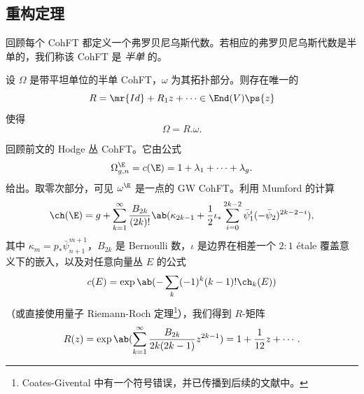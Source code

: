 \subsection{重构定理}%
\label{sub:Reconstruction theorem}

回顾每个 CohFT 都定义一个弗罗贝尼乌斯代数。若相应的弗罗贝尼乌斯代数是半单的，我们称该 CohFT 是 \textit{半单} 的。

\begin{thm}%
\label{thm:teleman}
    设 $\Omega$ 是带平坦单位的半单 CohFT，$\omega$ 为其拓扑部分。则存在唯一的
    \[ R = \mr{Id} + R_1 z + \cdots \in \End(V)\ps{z} \]
    使得
    \[ \Omega = R.\omega. \]
\end{thm}

\begin{exm}
    回顾前文的 Hodge 丛 CohFT。它由公式
    \[ \Omega^{\E}_{g,n} = c(\E) = 1 + \lambda_1 + \cdots + \lambda_g. \]
    给出。取零次部分，可见 $\omega^{\E}$ 是一点的 GW CohFT。利用 Mumford 的计算
    \[ \ch(\E) = g + \sum_{k=1}^{\infty} \frac{B_{2k}}{(2k)!}\ab(\kappa_{2k-1} + \frac{1}{2}\iota_*\sum_{i=0}^{2k-2} \bar{\psi}_1^{i} (-\bar{\psi}_2)^{2k-2-i}), \]
    其中 $\kappa_{m} = p_* \bar{\psi}_{n+1}^{m+1}$，$B_{2k}$ 是 Bernoulli 数，$\iota$ 是边界在相差一个 $2:1$ \'etale 覆盖意义下的嵌入，以及对任意向量丛 $E$ 的公式
    \[ c(E) = \exp \ab(-\sum_k (-1)^k (k-1)!\ch_k(E)) \]
    （或直接使用量子 Riemann-Roch 定理\footnote{Coates-Givental 中有一个符号错误，并已传播到后续的文献中。}），我们得到 $R$-矩阵
    \[ R(z) = \exp\ab( \sum_{k=1}^{\infty} \frac{B_{2k}}{2k(2k-1)} z^{2k-1}) = 1+\frac{1}{12}z + \cdots. \]


\end{exm}
